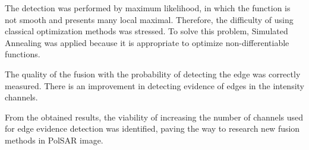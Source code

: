 \documentclass[conference]{IEEEtran}
\begin{document}
The detection was performed by maximum likelihood, in which the function is not smooth and presents many local maximal.
Therefore, the difficulty of using classical optimization methods was stressed. 
To solve this problem, Simulated Annealing was applied because it is appropriate to optimize non-differentiable functions.

The quality of the fusion with the probability of detecting the edge was correctly measured. There is an improvement in detecting evidence of edges in the intensity channels.

From the obtained results, the viability of increasing the number of channels used for edge evidence detection was identified, paving the way to research new fusion methods in PolSAR image.



\end{document}
